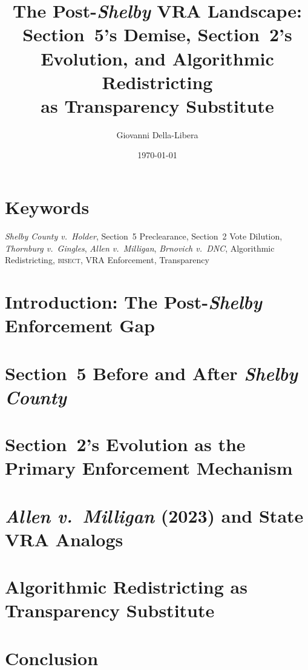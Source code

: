 \documentclass[12pt]{article}
\title{\textbf{The Post-\textit{Shelby} VRA Landscape:\\
Section~5's Demise, Section~2's Evolution, and Algorithmic Redistricting\\
as Transparency Substitute}}
\author{Giovanni Della-Libera}
\date{\today}
\begin{document}
\maketitle

\begin{abstract}

\end{abstract}

\section*{Keywords}
\textit{Shelby County v.\ Holder}, Section~5 Preclearance, Section~2
Vote Dilution, \textit{Thornburg v.\ Gingles}, \textit{Allen v.\ Milligan},
\textit{Brnovich v.\ DNC}, Algorithmic Redistricting, \textsc{bisect},
VRA Enforcement, Transparency

\section{Introduction: The Post-\textit{Shelby} Enforcement Gap}


\section{Section~5 Before and After \textit{Shelby County}}


\section{Section~2's Evolution as the Primary Enforcement Mechanism}


\section{\textit{Allen v.\ Milligan} (2023) and State VRA Analogs}


\section{Algorithmic Redistricting as Transparency Substitute}


\section{Conclusion}




\end{document}

